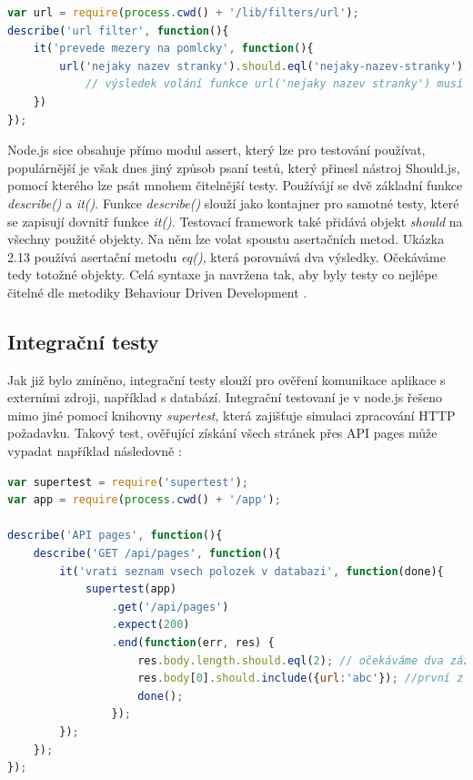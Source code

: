 \begin{lstlisting}[language=Javascript,caption={Ukázka jednoduchého unit testu ve frameworku Mocha \cite{zdrojak_jstesting}.}]
var url = require(process.cwd() + '/lib/filters/url');
describe('url filter', function(){
    it('prevede mezery na pomlcky', function(){
        url('nejaky nazev stranky').should.eql('nejaky-nazev-stranky');
            // výsledek volání funkce url('nejaky nazev stranky') musí být 'nejaky-nazev-stranky'
    })
});
\end{lstlisting}
Node.js sice obsahuje přímo modul assert, který lze pro testování používat, populárnější je však dnes jiný způsob psaní testů, který přinesl nástroj Should.js, pomocí kterého lze psát mnohem čitelnější testy. Používájí se dvě základní funkce \textit{describe()} a \textit{it()}. Funkce \textit{describe()} slouží jako kontajner pro samotné testy, které se zapisují dovnitř funkce \textit{it()}. Testovací framework také přidává objekt \textit{should} na všechny použité objekty. Na něm lze volat spoustu asertačních metod. Ukázka 2.13 používá asertační metodu \textit{eq()}, která porovnává dva výsledky. Očekáváme tedy totožné objekty. Celá syntaxe ja navržena tak, aby byly testy co nejlépe čitelné dle metodiky Behaviour Driven Development \cite{jstesting} \cite{should_js}.

\subsection{Integrační testy}
Jak již bylo zmíněno, integrační testy slouží pro ověření komunikace aplikace s externími zdroji, například s databází. Integrační testovaní je v node.js řešeno mimo jiné pomocí knihovny \textit{supertest}, která zajišťuje simulaci zpracování HTTP požadavku. Takový test, ověřující získání všech stránek přes API pages může vypadat například následovně \cite{zdrojak_jstesting} \cite{jstesting}:

\begin{lstlisting}[language=Javascript,caption={Ukázka integračního testů pomocí frameworku supertest \cite{zdrojak_jstesting}.}]
var supertest = require('supertest');
var app = require(process.cwd() + '/app');

describe('API pages', function(){
    describe('GET /api/pages', function(){
        it('vrati seznam vsech polozek v databazi', function(done){
            supertest(app)
                .get('/api/pages')
                .expect(200)
                .end(function(err, res) {
                    res.body.length.should.eql(2); // očekáváme dva záznamy
                    res.body[0].should.include({url:'abc'}); //první z nich musí obsahovat klíč url s hodnotou 'abc'
                    done();
                });
        });
    });
});
\end{lstlisting}

